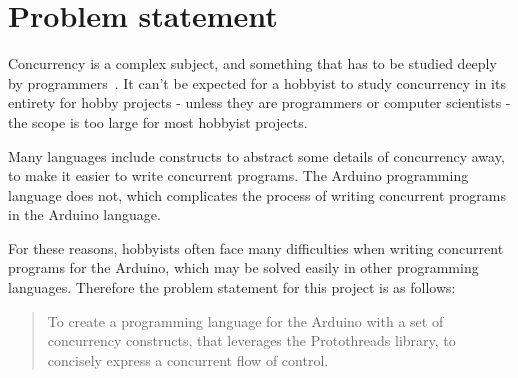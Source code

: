 \section{Problem statement}\label{sec:problemstatement}
Concurrency is a complex subject, and something that has to be studied deeply by programmers~\cite{Sebesta2016}. It can't be expected for a hobbyist to study concurrency in its entirety for hobby projects - unless they are programmers or computer scientists - the scope is too large for most hobbyist projects.

Many languages include constructs to abstract some details of concurrency away, to make it easier to write concurrent programs. The Arduino programming language does not, which complicates the process of writing concurrent programs in the Arduino language.

For these reasons, hobbyists often face many difficulties when writing concurrent programs for the Arduino, which may be solved easily in other programming languages. Therefore the problem statement for this project is as follows:

\blockquote{To create a programming language for the Arduino with a set of concurrency constructs, that leverages the Protothreads library, to concisely express a concurrent flow of control.}








